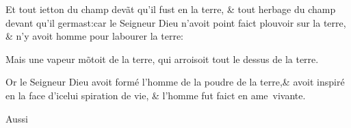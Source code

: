 \documentclass[twocolumn,paper=a4,pagesize=pdftex,12pt,headinclude=on]{scrbook}
\newcounter{verse}
\newcommand{\bverse}{%
  \addtocounter{verse}{1}
  \theverse\quad
}
\begin{document}
\bverse Et tout ietton du champ dev\~at qu'il
fust en la terre, \& tout herbage du
champ devant qu'il germast:car le Sei\-gneur
Dieu n'avoit point faict \footnotemarkmain{}plou\-voir
sur la terre, \& n'y avoit homme
pour labourer la terre:

\bverse Mais une vapeur m\~otoit de la terre,
qui arroisoit tout le dessus de la terre.

\bverse Or le Seigneur Dieu avoit formé
l'homme \footnotemarkmain{}de la poudre
de la terre,\footnotemarkmain{}\&
avoit inspiré en la face d'icelui spira\-tion
de vie, \& l'homme fut faict en
ame~vivante.

\begin{flushright}
Aussi
\end{flushright}
\end{document}

